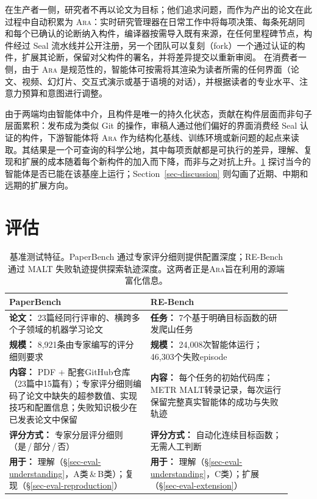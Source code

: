 \documentclass[
]{article}
\theoremstyle{definition}
\newcommand{\ara}{\textsc{Ara}}
\begin{document}
在生产者一侧，研究者不再以论文为目标；他们追求问题，而作为产出的论文在此过程中自动积累为
\ara{}：实时研究管理器在日常工作中将每项决策、每条死胡同和每个已确认的论断纳入构件，编译器按需导入既有来源，在任何里程碑节点，构件经过
Seal
流水线并公开注册，另一个团队可以复刻（fork）一个通过认证的构件，扩展其论断，保留对父构件的署名，并将差异提交以重新审阅。
在消费者一侧，由于 \ara{}
是规范性的，智能体可按需将其渲染为读者所需的任何界面（论文、视频、幻灯片、交互式演示或基于语境的对话），并根据读者的专业水平、注意力预算和意图进行调整。

由于两端均由智能体中介，且构件是唯一的持久化状态，贡献在构件层面而非句子层面累积：发布成为类似
Git 的操作，审稿人通过他们偏好的界面消费经 Seal 认证的构件，下游智能体将
\ara{}
作为结构化基线、训练环境或新问题的起点来读取。其结果是一个可查询的科学公地，其中每项贡献都是可执行的差异，理解、复现和扩展的成本随着每个新构件的加入而下降，而非与之对抗上升。\ref{sec-eval}
探讨当今的智能体是否已能在该基座上运行；Section~\ref{sec-discussion}
则勾画了近期、中期和远期的扩展方向。

\FloatBarrier

\section{评估}\label{sec-eval}

\begin{table}[t]
  \centering
  \small
  \begin{tabular}{@{} p{0.46\linewidth} | p{0.46\linewidth} @{}}
  \toprule
  \textbf{PaperBench}~\citep{starace2025paperbench} & \textbf{RE-Bench}~\citep{wijk2025rebench} \\
  \midrule
  \textbf{论文：} 23篇经同行评审的、横跨多个子领域的机器学习论文 &
  \textbf{任务：} 7个基于明确目标函数的研发爬山任务 \\
  \midrule
  \textbf{规模：} 8,921条由专家编写的评分细则要求 &
  \textbf{规模：} 24,008次智能体运行；46,303个失败episode \\
  \midrule
  \textbf{内容：} PDF + 配套GitHub仓库（23篇中15篇有）；专家评分细则编码了论文中缺失的超参数值、实现技巧和配置信息；失败知识极少在已发表论文中保留 &
  \textbf{内容：} 每个任务的初始代码库；METR MALT转录记录，每次运行保留完整真实智能体的成功与失败轨迹 \\
  \midrule
  \textbf{评分方式：} 专家分层评分细则（是\,/\,部分\,/\,否） &
  \textbf{评分方式：} 自动化连续目标函数；无需人工判断 \\
  \midrule
  \textbf{用于：} 理解（\S\ref{sec-eval-understanding}，A类\,\&\,B类）；复现（\S\ref{sec-eval-reproduction}） &
  \textbf{用于：} 理解（\S\ref{sec-eval-understanding}，C类）；扩展（\S\ref{sec-eval-extension}） \\
  \bottomrule
  \end{tabular}
  \caption{基准测试特征。PaperBench 通过专家评分细则提供配置深度；RE-Bench 通过 MALT 失败轨迹提供探索轨迹深度。这两者正是\ara{}旨在利用的源端富化信息。}
  \label{tab-benchmarks}
\end{table}
\end{document}
